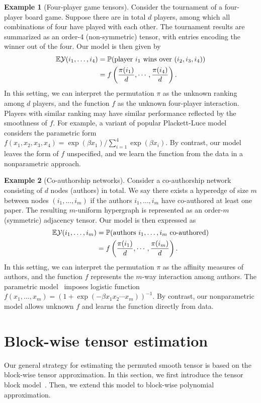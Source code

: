 \documentclass[11pt]{article}
\theoremstyle{definition}
\newtheorem{example}{Example}
\begin{document}
\begin{example}[Four-player game tensors] Consider the tournament of a four-player board game. Suppose there are in total $d$ players, among which all combinations of four have played with each other. The tournament results are summarized as an order-4 (non-symmetric) tensor, with entries encoding the winner out of the four. Our model is then given by
\begin{align}
\mathbb{E}\mathcal{Y}(i_1,\ldots,i_4)&=\mathbb{P}(\text{player $i_1$ wins over $(i_2,i_3,i_4)$})\\&
=f\left({\pi(i_1)\over d},\cdots, {\pi(i_4)\over d}\right).
\end{align}
In this setting, we can interpret the permutation $\pi$ as the unknown ranking among $d$ players, and the function $f$ as the unknown four-player interaction. Players with similar ranking may have similar performance reflected by the smoothness of $f$. For example, a variant of popular Plackett-Luce model~\citep{chen2021optimal} considers the parametric form $f(x_1,x_2,x_3,x_4)={\exp(\beta x_1)/ \sum_{i=1}^4\exp(\beta x_i)}$. By contrast, our model leaves the form of $f$ unspecified, and we learn the function from the data in a nonparametric approach. 
\end{example}

\begin{example}[Co-authorship networks] Consider a co-authorship network consisting of $d$ nodes (authors) in total. We say there exists a hyperedge of size $m$ between nodes $(i_1,\ldots,i_m)$ if the authors $i_1,\ldots,i_m$ have co-authored at least one paper. The resulting $m$-uniform hypergraph is represented as an order-$m$ (symmetric) adjacency tensor. Our model is then expressed as
\begin{align}
    \mathbb{E}\mathcal{Y}(i_1,\ldots,i_m)&=\mathbb{P}(\text{authors $i_1,\ldots,i_m$ co-authored})\\&
=f\left({\pi(i_1)\over d},\cdots, {\pi(i_m)\over d}\right).
\end{align}
In this setting, we can interpret the permutation $\pi$ as the affinity measures of authors, and the function $f$ represents the $m$-way interaction among authors. The parametric model~\citep{wang2018learning} imposes logistic function $f(x_1,\ldots,x_m)=(1+\exp(-\beta x_1x_2\cdots x_m))^{-1}$. By contrast, our nonparametric model allows unknown $f$ and learns the function directly from data. 
\end{example}


\section{Block-wise tensor estimation}\label{sec:tba}
Our general strategy for estimating the permuted smooth tensor is based on the block-wise tensor approximation. In this section, we first introduce the tensor block model~\citep{wang2019multiway,han2020exact}. Then, we extend this model to block-wise polynomial approximation.
\end{document}
